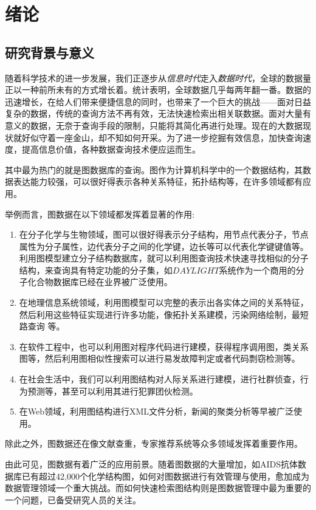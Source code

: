 \documentclass{XDBAthesis}
\begin{document}
\else
\fi
\chapter{绪论}
\label{chap:introduction}
\section{研究背景与意义}
随着科学技术的进一步发展，我们正逐步从\emph{信息时代}走入\emph{数据时代}\cite{BigData}，全球的数据量正以一种前所未有的方式增长着。统计表明，全球数据几乎每两年翻一番\cite{dataincrease}。数据的迅速增长，在给人们带来便捷信息的同时，也带来了一个巨大的挑战——面对日益复杂的数据，传统的查询方法不再有效，无法快速检索出相关联数据。面对大量有意义的数据，无奈于查询手段的限制，只能将其简化再进行处理。现在的大数据现状就好似守着一座金山，却不知如何开采。为了进一步挖掘有效信息，加快查询速度，提高信息价值，各种数据查询技术便应运而生。

其中最为热门的就是图数据库的查询。图作为计算机科学中的一个数据结构\cite{dataincrease}，其数据表达能力较强，可以很好得表示各种关系特征，拓扑结构等，在许多领域都有应用。

举例而言，图数据在以下领域都发挥着显著的作用:
\begin{enumerate}
    \item 在分子化学\cite{yp}与生物\cite{yy}领域，图可以很好得表示分子结构，用节点代表分子，节点属性为分子属性，边代表分子之间的化学键，边长等可以代表化学键键值等。利用图模型建立分子结构数据库，就可以利用图查询技术快速寻找相似的分子结构，来查询具有特定功能的分子集，如$DAYLIGHT$系统\cite{daylight}作为一个商用的分子化合物数据库已经在业界被广泛使用。
    \item 在地理信息系统领域\cite{y6,y7,y8}，利用图模型可以完整的表示出各实体之间的关系特征，然后利用这些特征实现进行许多功能，像拓扑关系建模，污染网络绘制，最短路查询\cite{y8} 等。
    \item 在软件工程中，也可以利用图对程序代码进行建模，获得程序调用图，类关系图等，然后利用图相似性搜索可以进行易发故障判定或者代码剽窃检测\cite{copy}等。
    \item 在社会生活中，我们可以利用图结构对人际关系进行建模，进行社群侦查，行为预测等，甚至可以利用其进行犯罪团伙检测\cite{y10}。
    \item 在Web领域，利用图结构进行XML文件分析，新闻的聚类分析等早被广泛使用。
\end{enumerate}

除此之外，图数据还在像文献查重\cite{y9}，专家推荐系统等众多领域发挥着重要作用。

由此可见，图数据有着广泛的应用前景。随着图数据的大量增加，如AIDS抗体数据库已有超过42,000个化学结构图，如何对图数据进行有效管理与使用，愈加成为数据管理领域一个重大挑战。而如何快速检索图结构则是图数据管理中最为重要的一个问题，已备受研究人员的关注。
\end{document}
